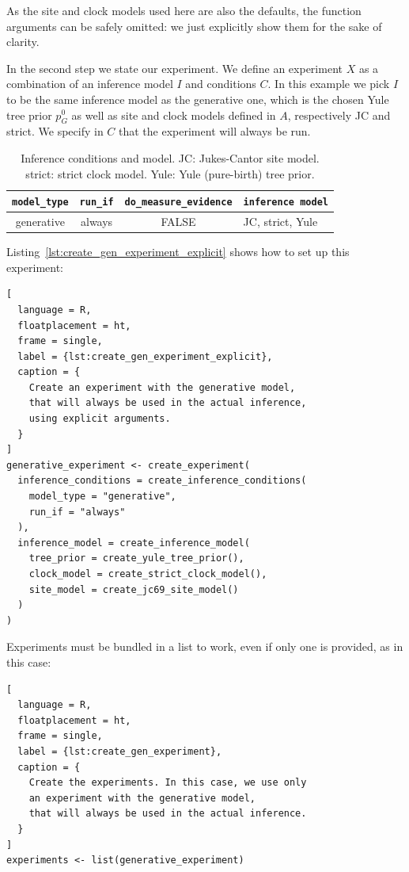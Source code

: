 As the site and clock models used here are also the defaults, 
the function arguments can be safely omitted: we just explicitly show 
them for the sake of clarity.

In the second step we state our experiment.
We define an experiment $\mathit{X}$ as a combination of an inference model 
$\mathit{I}$ and conditions $\mathit{C}$.
In this example we pick $\mathit{I}$ to be the same inference model as 
the generative one,
which is the chosen Yule tree prior $\mathit{p_{G}^0}$ as well as site 
and clock models defined in $\mathit{A}$, respectively JC and strict.
We specify in $\mathit{C}$ that the experiment will always be run.

\begin{table}
  \begin{tabular}{ | c | c | c | l | }
    \hline
    \texttt{model\_type} &
    \texttt{run\_if} &
    \texttt{do\_measure\_evidence} & 
    \texttt{inference model} \\ 
    \hline
    generative &
    always &
    FALSE &
    JC, strict, Yule \\
    \hline
  \end{tabular}
  \caption{
    Inference conditions and model.
    JC: Jukes-Cantor site model.
    strict: strict clock model.
    Yule: Yule (pure-birth) tree prior.
  }
  \label{tab:RQ1}
\end{table}

Listing~\ref{lst:create_gen_experiment_explicit} shows how to
set up this experiment:

\begin{lstlisting}[
  language = R,
  floatplacement = ht,
  frame = single,
  label = {lst:create_gen_experiment_explicit},
  caption = {
    Create an experiment with the generative model,
    that will always be used in the actual inference, 
    using explicit arguments.
  }
]
generative_experiment <- create_experiment(
  inference_conditions = create_inference_conditions(
    model_type = "generative", 
    run_if = "always"
  ), 
  inference_model = create_inference_model(
    tree_prior = create_yule_tree_prior(),
    clock_model = create_strict_clock_model(), 
    site_model = create_jc69_site_model()
  )
)
\end{lstlisting}

Experiments must be bundled in a list to work, even if only one is provided, as 
in this case:

\begin{lstlisting}[
  language = R, 
  floatplacement = ht,
  frame = single,
  label = {lst:create_gen_experiment},
  caption = {
    Create the experiments. In this case, we use only
    an experiment with the generative model,
    that will always be used in the actual inference.
  }
]
experiments <- list(generative_experiment)
\end{lstlisting}

